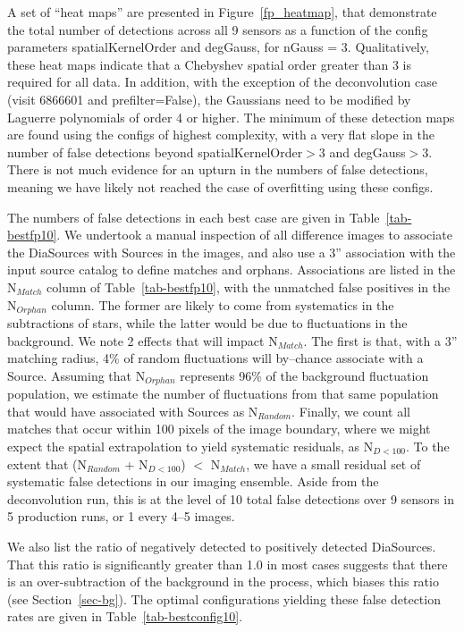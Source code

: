 \documentclass[prd, nofootinbib, floatfix, 11pt,tightenlines,times]{article}
\begin{document}
A set of ``heat maps'' are presented in Figure~\ref{fp_heatmap}, that
demonstrate the total number of detections across all 9 sensors as a
function of the config parameters spatialKernelOrder and degGauss, for
nGauss = 3.  Qualitatively, these heat maps indicate that a Chebyshev
spatial order greater than 3 is required for all data.  In addition,
with the exception of the deconvolution case (visit 6866601 and
prefilter=False), the Gaussians need to be modified by Laguerre
polynomials of order 4 or higher.  The minimum of these detection maps
are found using the configs of highest complexity, with a very flat
slope in the number of false detections beyond spatialKernelOrder$>$3
and degGauss$>$3.  There is not much evidence for an upturn in the
numbers of false detections, meaning we have likely not reached the
case of overfitting using these configs.

The numbers of false detections in each best case are given in
Table~\ref{tab-bestfp10}.  We undertook a manual inspection of all
difference images to associate the DiaSources with Sources in the
images, and also use a 3'' association with the input source catalog
to define matches and orphans.  Associations are listed in the
N$_{Match}$ column of Table~\ref{tab-bestfp10}, with the unmatched
false positives in the N$_{Orphan}$ column.  The former are likely to
come from systematics in the subtractions of stars, while the latter
would be due to fluctuations in the background.  We note 2 effects
that will impact N$_{Match}$.  The first is that, with a 3'' matching
radius, 4\% of random fluctuations will by--chance associate with a
Source.  Assuming that N$_{Orphan}$ represents 96\% of the background
fluctuation population, we estimate the number of fluctuations from
that same population that would have associated with Sources as
N$_{Random}$.  Finally, we count all matches that occur within 100
pixels of the image boundary, where we might expect the spatial
extrapolation to yield systematic residuals, as N$_{D<100}$.  To the
extent that (N$_{Random}$ + N$_{D<100}$) $<$ N$_{Match}$, we have a
small residual set of systematic false detections in our imaging
ensemble.  Aside from the deconvolution run, this is at the level of
10 total false detections over 9 sensors in 5 production runs, or 1
every 4--5 images.

We also list the ratio of negatively detected to positively detected
DiaSources.  That this ratio is significantly greater than 1.0 in most
cases suggests that there is an over-subtraction of the background in
the process, which biases this ratio (see Section~\ref{sec-bg}).  The
optimal configurations yielding these false detection rates are given
in Table~\ref{tab-bestconfig10}.
\end{document}
